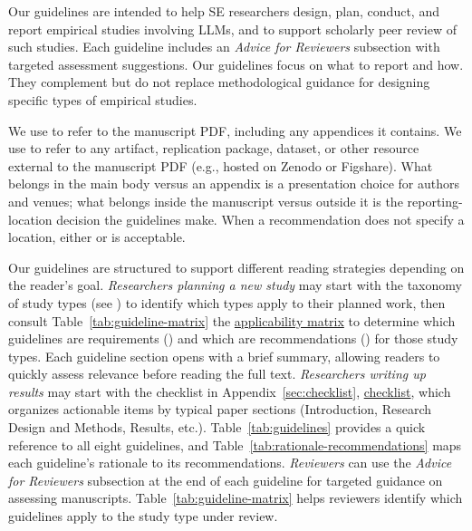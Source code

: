 
Our guidelines are intended to help SE researchers design, plan, conduct,
and report empirical studies involving LLMs, and to support scholarly peer
review of such studies. Each guideline includes an \emph{Advice for
Reviewers} subsection with targeted assessment suggestions.
Our guidelines focus on what to report and how. They complement but do not replace methodological guidance for designing specific types of empirical studies.


We use \paper to refer to the manuscript PDF, including any appendices it contains. We use \supplementarymaterial to refer to any artifact, replication package, dataset, or other resource external to the manuscript PDF (e.g., hosted on Zenodo or Figshare). What belongs in the main body versus an appendix is a presentation choice for authors and venues; what belongs inside the manuscript versus outside it is the reporting-location decision the guidelines make. When a recommendation does not specify a location, either \paper or \supplementarymaterial is acceptable.


Our guidelines are structured to support different reading strategies depending on the reader's goal.
\emph{Researchers planning a new study} may start with the taxonomy of study types (see \studytypes) to identify which types apply to their planned work, then consult \ifpaper Table~\ref{tab:guideline-matrix} \else the \href{/guidelines/\#guidelines-by-study-type}{applicability matrix} \fi to determine which guidelines are requirements (\must) and which are recommendations (\should) for those study types. Each guideline section opens with a brief summary, allowing readers to quickly assess relevance before reading the full text.
\emph{Researchers writing up results} may start with the \ifpaper checklist in Appendix~\ref{sec:checklist}, \else \href{/checklist/}{checklist}, \fi which organizes actionable items by typical paper sections (Introduction, Research Design and Methods, Results, etc.). \ifpaper Table~\ref{tab:guidelines} provides a quick reference to all eight guidelines, and Table~\ref{tab:rationale-recommendations} maps each guideline's rationale to its recommendations. \fi
\emph{Reviewers} can use the \emph{Advice for Reviewers} subsection at the end of each guideline for targeted guidance on assessing manuscripts. \ifpaper Table~\ref{tab:guideline-matrix} helps reviewers identify which guidelines apply to the study type under review. \fi

